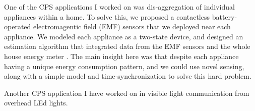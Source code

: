 \documentclass[10pt]{article}
\begin{document}

One of the CPS applications I worked on was dis-aggregation of
individual appliances within a home.  To solve this, we proposed a
contactless battery-operated electromagentic field (EMF) sensors that
we deployed near each appliance. We modeled each appliance as a
two-state device, and designed an estimation algorithm that integrated
data from the EMF sensors and the whole house energy meter
\cite{rajagopal2013magnetic, rajagopal2013demo}. The main insight here
was that despite each appliance having a unique energy consumption
pattern, and we could use novel sensing, along with a simple model and
time-synchronization to solve this hard problem.





Another CPS application I have worked on in visible light communication from overhead LEd lights. 
\end{document}
